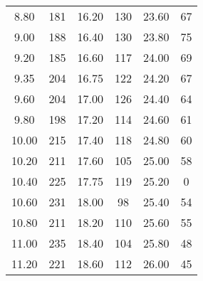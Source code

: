 \begin{table}
\begin{tabular}{S S S S S S }
8.80  & 181  & 16.20  & 130  & 23.60  & 67\\ 
9.00  & 188  & 16.40  & 130  & 23.80  & 75\\ 
9.20  & 185  & 16.60  & 117  & 24.00  & 69\\ 
9.35  & 204  & 16.75  & 122  & 24.20  & 67\\ 
9.60  & 204  & 17.00  & 126  & 24.40  & 64\\ 
9.80  & 198  & 17.20  & 114  & 24.60  & 61\\ 
10.00  & 215  & 17.40  & 118  & 24.80  & 60\\ 
10.20  & 211  & 17.60  & 105  & 25.00  & 58\\ 
10.40  & 225  & 17.75  & 119  & 25.20  & 0\\ 
10.60  & 231  & 18.00  & 98  & 25.40  & 54\\ 
10.80  & 211  & 18.20  & 110  & 25.60  & 55\\ 
11.00  & 235  & 18.40  & 104  & 25.80  & 48\\ 
11.20  & 221  & 18.60  & 112  & 26.00  & 45\\ 
\bottomrule 
\end{tabular} 
\end{table}